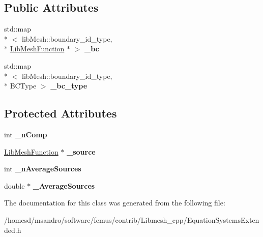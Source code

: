 \subsection*{Public Attributes}
\begin{DoxyCompactItemize}
\item 
\hypertarget{class_equation_systems_extended_a37c0c30082ee92fc8195969695d87474}{std\-::map\\*
$<$ lib\-Mesh\-::boundary\-\_\-id\-\_\-type, \\*
\hyperlink{class_lib_mesh_function}{Lib\-Mesh\-Function} $\ast$ $>$ {\bfseries \-\_\-bc}}\label{class_equation_systems_extended_a37c0c30082ee92fc8195969695d87474}

\item 
\hypertarget{class_equation_systems_extended_abe0bbb5dd4e66bb634d5e3003451d3b9}{std\-::map\\*
$<$ lib\-Mesh\-::boundary\-\_\-id\-\_\-type, \\*
B\-C\-Type $>$ {\bfseries \-\_\-bc\-\_\-type}}\label{class_equation_systems_extended_abe0bbb5dd4e66bb634d5e3003451d3b9}

\end{DoxyCompactItemize}
\subsection*{Protected Attributes}
\begin{DoxyCompactItemize}
\item 
\hypertarget{class_equation_systems_extended_aeeef0f52af137e0ae8021e7fb6989e2a}{int {\bfseries \-\_\-n\-Comp}}\label{class_equation_systems_extended_aeeef0f52af137e0ae8021e7fb6989e2a}

\item 
\hypertarget{class_equation_systems_extended_a5609a5a415dea40ff7264b6b53cf26b7}{\hyperlink{class_lib_mesh_function}{Lib\-Mesh\-Function} $\ast$ {\bfseries \-\_\-source}}\label{class_equation_systems_extended_a5609a5a415dea40ff7264b6b53cf26b7}

\item 
\hypertarget{class_equation_systems_extended_a0505b7fb4c30cafd27c60fe6687d15e3}{int {\bfseries \-\_\-n\-Average\-Sources}}\label{class_equation_systems_extended_a0505b7fb4c30cafd27c60fe6687d15e3}

\item 
\hypertarget{class_equation_systems_extended_abad40a2d66eb3c3fbef641e903e06b24}{double $\ast$ {\bfseries \-\_\-\-Average\-Sources}}\label{class_equation_systems_extended_abad40a2d66eb3c3fbef641e903e06b24}

\end{DoxyCompactItemize}


The documentation for this class was generated from the following file\-:\begin{DoxyCompactItemize}
\item 
/homesd/msandro/software/femus/contrib/\-Libmesh\-\_\-cpp/Equation\-Systems\-Extended.\-h\end{DoxyCompactItemize}

